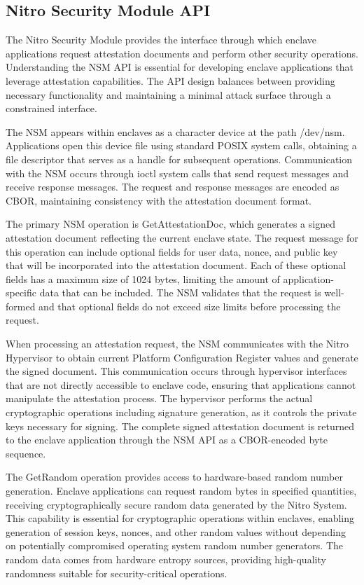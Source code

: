 \subsection{Nitro Security Module API}

The Nitro Security Module provides the interface through which enclave applications request attestation documents and perform other security operations. Understanding the NSM API is essential for developing enclave applications that leverage attestation capabilities. The API design balances between providing necessary functionality and maintaining a minimal attack surface through a constrained interface.

The NSM appears within enclaves as a character device at the path /dev/nsm. Applications open this device file using standard POSIX system calls, obtaining a file descriptor that serves as a handle for subsequent operations. Communication with the NSM occurs through ioctl system calls that send request messages and receive response messages. The request and response messages are encoded as CBOR, maintaining consistency with the attestation document format.

The primary NSM operation is GetAttestationDoc, which generates a signed attestation document reflecting the current enclave state. The request message for this operation can include optional fields for user data, nonce, and public key that will be incorporated into the attestation document. Each of these optional fields has a maximum size of 1024 bytes, limiting the amount of application-specific data that can be included. The NSM validates that the request is well-formed and that optional fields do not exceed size limits before processing the request.

When processing an attestation request, the NSM communicates with the Nitro Hypervisor to obtain current Platform Configuration Register values and generate the signed document. This communication occurs through hypervisor interfaces that are not directly accessible to enclave code, ensuring that applications cannot manipulate the attestation process. The hypervisor performs the actual cryptographic operations including signature generation, as it controls the private keys necessary for signing. The complete signed attestation document is returned to the enclave application through the NSM API as a CBOR-encoded byte sequence.

The GetRandom operation provides access to hardware-based random number generation. Enclave applications can request random bytes in specified quantities, receiving cryptographically secure random data generated by the Nitro System. This capability is essential for cryptographic operations within enclaves, enabling generation of session keys, nonces, and other random values without depending on potentially compromised operating system random number generators. The random data comes from hardware entropy sources, providing high-quality randomness suitable for security-critical operations.

